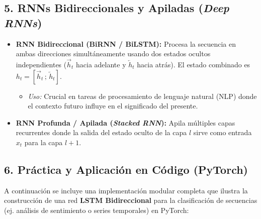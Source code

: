 \subsection{5. RNNs Bidireccionales y Apiladas (\emph{Deep RNNs})}

\begin{itemize}
	\item \textbf{RNN Bidireccional (BiRNN / BiLSTM):} Procesa la secuencia en ambas direcciones simultáneamente usando dos estados ocultos independientes ($\overrightarrow{h}_t$ hacia adelante y $\overleftarrow{h}_t$ hacia atrás). El estado combinado es $h_t = [\overrightarrow{h}_t \,;\, \overleftarrow{h}_t]$.
	\begin{itemize}
		\item \emph{Uso:} Crucial en tareas de procesamiento de lenguaje natural (NLP) donde el contexto futuro influye en el significado del presente.
	\end{itemize}
	
	\item \textbf{RNN Profunda / Apilada (\emph{Stacked RNN}):} Apila múltiples capas recurrentes donde la salida del estado oculto de la capa $l$ sirve como entrada $x_t$ para la capa $l+1$.
\end{itemize}

\subsection{6. Práctica y Aplicación en Código (PyTorch)}

A continuación se incluye una implementación modular completa que ilustra la construcción de una red \textbf{LSTM Bidireccional} para la clasificación de secuencias (ej. análisis de sentimiento o series temporales) en PyTorch:

